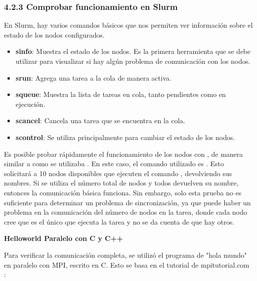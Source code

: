 \begin{spacing}{1.5}
\subsubsection {4.2.3 Comprobar funcionamiento en Slurm}

En Slurm, hay varios comandos básicos que nos permiten ver información sobre el estado de los nodos configurados.

\begin{itemize}
    \item \textbf{sinfo}: Muestra el estado de los nodos. Es la primera herramienta que se debe utilizar para visualizar si hay algún problema de comunicación con los nodos.
    \item \textbf{srun}: Agrega una tarea a la cola de manera activa.
    \item \textbf{squeue}: Muestra la lista de tareas en cola, tanto pendientes como en ejecución.
    \item \textbf{scancel}: Cancela una tarea que se encuentra en la cola.
    \item \textbf{scontrol}: Se utiliza principalmente para cambiar el estado de los nodos.
\end{itemize}
    
Es posible probar rápidamente el funcionamiento de los nodos con , de manera similar a como se utilizaba . En este caso, el comando utilizado es . Esto solicitará a 10 nodos disponibles que ejecuten el comando , devolviendo sus nombres. Si se utiliza el número total de nodos y todos devuelven su nombre, entonces la comunicación básica funciona. Sin embargo, solo esta prueba no es suficiente para determinar un problema de sincronización, ya que puede haber un problema en la comunicación del número de nodos en la tarea, donde cada nodo cree que es el único que ejecuta la tarea y no se da cuenta de que hay otros.

\textbf{Helloworld Paralelo con C y C++} 

Para verificar la comunicación completa, se utilizó el programa de "hola mundo" en paralelo con MPI, escrito en C. Esto se basa en el tutorial de mpitutorial.com \cite{HelloC}:



\end{spacing}
